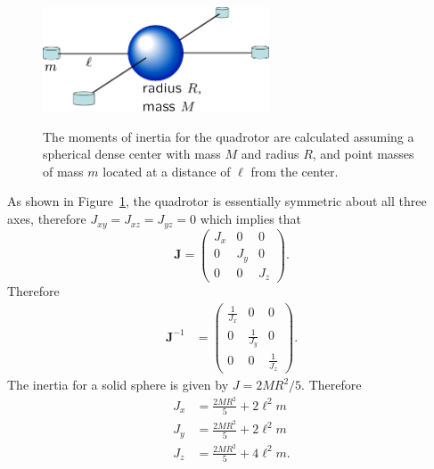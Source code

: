 {\begin{figure}[hhhhtb]
  \centering
  \includegraphics[width=0.6\textwidth]{chap3_multirotor/figures/quadrotor_inertia}\\
  \caption{The moments of inertia for the quadrotor are calculated
  assuming a spherical dense center with mass $M$ and radius $R$,
  and point masses of mass $m$ located at a distance of $\ell$ from
  the center.}%
  \label{fig:quadrotor_inertia}
\end{figure}
As shown in Figure~\ref{fig:quadrotor_inertia}, the quadrotor is
essentially symmetric about all three axes, therefore
$J_{xy}=J_{xz}=J_{yz}=0$ which implies that
\[
\mathbf{J} =
    \begin{pmatrix}
    J_{x}   & 0       & 0 \\
    0       & J_{y}   & 0 \\
    0 & 0       & J_{z}
    \end{pmatrix}.
\]
Therefore
\begin{align*}
\mathbf{J}^{-1}
    &= \begin{pmatrix}
        \frac{1}{J_x} & 0 & 0 \\
        0 & \frac{1}{J_y} & 0 \\
        0 & 0 & \frac{1}{J_z}
       \end{pmatrix}.
\end{align*}
The inertia for a solid sphere is given by
$J=2MR^2/5$\cite{HallidayResnick}.  Therefore
\begin{align*}
J_x &= \frac{2MR^2}{5} + 2\ell^2m \\
J_y &= \frac{2MR^2}{5} + 2\ell^2m \\
J_z &= \frac{2MR^2}{5} + 4\ell^2m.
\end{align*}


}

